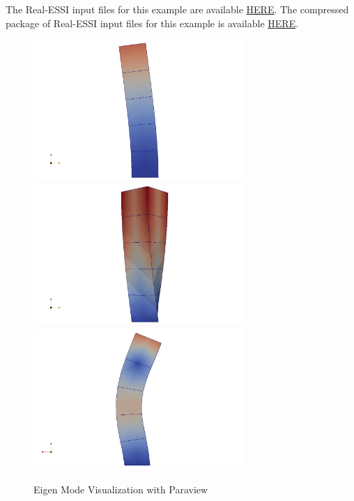 The Real-ESSI input files for this example are available 
\href{https://github.com/yuan-energy/Real-ESSI-Short-Course-Examples/tree/master/short-course-examples/Day1/Postprocess_examples_with_Paraview/eigen}{HERE}. 
The compressed package of Real-ESSI input files for this example is available 
\href{https://github.com/yuan-energy/Real-ESSI-Short-Course-Examples/blob/master/short-course-examples/Day1/Postprocess_examples_with_Paraview/eigen/eigen.tgz?raw=true}{HERE}.  

\begin{figure}[H]
  \centering
  \includegraphics[width = 8cm]{./Figure-files/Day1/Postprocess_examples_with_Paraview/eigenmode1.jpg}
  \includegraphics[width = 8cm]{./Figure-files/Day1/Postprocess_examples_with_Paraview/eigenmode2.jpg}
  \includegraphics[width = 8cm]{./Figure-files/Day1/Postprocess_examples_with_Paraview/eigenmode3.jpg}
  \caption{Eigen Mode Visualization with Paraview}
  \label{fig_paraview_eigen}
\end{figure}


